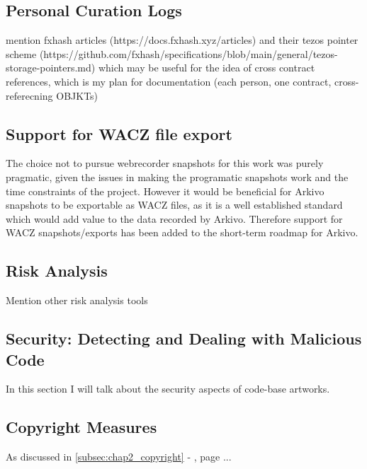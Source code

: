 \subsection{Personal Curation Logs}

mention fxhash articles (https://docs.fxhash.xyz/articles) and their tezos pointer scheme (https://github.com/fxhash/specifications/blob/main/general/tezos-storage-pointers.md) which may be useful for the idea of cross contract references, which is my plan for documentation (each person, one contract, cross-referecning OBJKTs)

\subsection{Support for WACZ file export}

The choice not to pursue webrecorder snapshots for this work was purely pragmatic, given the issues in making the programatic snapshots work and the time constraints of the project. However it would be beneficial for Arkivo snapshots to be exportable as WACZ files, as it is a well established standard which would add value to the data recorded by Arkivo. Therefore support for WACZ snapshots/exports has been added to the short-term roadmap for Arkivo.

\subsection{Risk Analysis}

Mention other risk analysis tools \cite{l2beatL2BEATStateLayer2024}


\subsection{Security: Detecting and Dealing with Malicious Code}

In this section I will talk about the security aspects of code-base artworks.





\subsection{Copyright Measures}


As discussed in \autoref{subsec:chap2_copyright} -  , page \pageref{subsec:chap2_copyright}... 